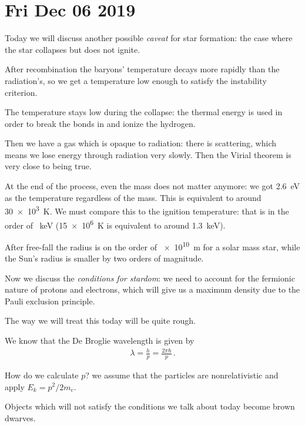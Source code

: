 \documentclass[main.tex]{subfiles}
\begin{document}
\section*{Fri Dec 06 2019}

Today we will discuss another possible \emph{caveat} for star formation: the case where the star collapses but does not ignite. 

After recombination the baryons' temperature decays more rapidly than the radiation's, so we get a temperature low enough to satisfy the instability criterion. 

The temperature stays low during the collapse: the thermal energy is used in order to break the bonds in  and ionize the hydrogen. 

Then we have a gas which is opaque to radiation: there is scattering, which means we lose energy through radiation very slowly. 
Then the Virial theorem is very close to being true. 

At the end of the process, even the mass does not matter anymore: we got \SI{2.6}{eV} as the temperature regardless of the mass. This is equivalent to around \SI{30e3}{K}.  
We must compare this to the ignition temperature: that is in the order of \SI{}{keV} (\SI{15e6}{K} is equivalent to around \SI{1.3}{keV}). 

After free-fall the radius is on the order of \SI{e10}{m} for a solar mass star, while the Sun's radius is smaller by two orders of magnitude. 

Now we discuss the \emph{conditions for stardom}: we need to account for the fermionic nature of protons and electrons, which will give us a maximum density due to the Pauli exclusion principle. 

The way we will treat this today will be quite rough. 

We know that the De Broglie wavelength is given by 
%
\begin{align}
  \lambda = \frac{h}{p} = \frac{2 \pi \hbar}{p}
\,.
\end{align}

How do we calculate \(p\)? we assume that the particles are nonrelativistic and apply \(E_{k} = p^2 /2m_e\). 

Objects which will not satisfy the conditions we talk about today become brown dwarves. 
\end{document}
